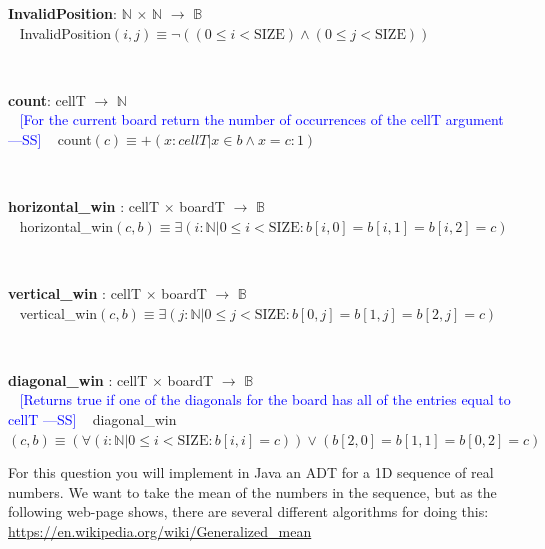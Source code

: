 \documentclass[12pt,fleqn]{examtst}
\newcommand{\authornote}[3]{\textcolor{#1}{[#3 ---#2]}}
\newcommand{\authornote}[3]{}
\newcommand{\wss}[1]{\authornote{blue}{SS}{#1}}
\begin{document}
\noindent \textbf{InvalidPosition}: $\mathbb{N}$ $\times$ $\mathbb{N}$ $\rightarrow$ $\mathbb{B}$\\
~\newline
InvalidPosition$(i, j) \equiv \neg ( ( 0 \leq i < \mbox{SIZE} ) \wedge ( 0 \leq j < \mbox{SIZE}))$

~\newline

\noindent \textbf{count}: cellT $\rightarrow$ $\mathbb{N}$\\
~\newline
\wss{For the current board return the number of occurrences of the cellT
  argument}
~\newline
count$(c) \equiv +(x : cellT | x \in b \land x = c : 1)$

~\newline

\noindent \textbf{horizontal\_win} : cellT $\times$ boardT $\rightarrow$ $\mathbb{B}$\\
~\newline
horizontal\_win$(c, b) \equiv \exists (i : \mathbb{N} | 0 \leq i < \mbox{SIZE} : b[i, 0] = b[i, 1] = b[i, 2] = c)$

~\newline

\noindent \textbf{vertical\_win} : cellT $\times$ boardT $\rightarrow$ $\mathbb{B}$\\
~\newline
vertical\_win$(c, b) \equiv \exists (j : \mathbb{N} | 0 \leq j < \mbox{SIZE} : b[0, j] = b[1, j] = b[2, j] = c)$

~\newline

\noindent \textbf{diagonal\_win} : cellT $\times$ boardT $\rightarrow$ $\mathbb{B}$\\
~\newline
\wss{Returns true if one of the diagonals for the board has all of the entries
  equal to cellT} 
~\newline
diagonal\_win$(c, b) \equiv (\forall(i : \mathbb{N}|0 \leq i < \mbox{SIZE}: b[i,i]=c)) \lor (b[2,0]=b[1,1]=b[0,2]=c)$



\newpage

 For this question you will implement in Java an ADT for a 1D
sequence of real numbers.  We want to take the mean of the numbers in the
sequence, but as the following web-page shows, there are several different
algorithms for doing this: \url{https://en.wikipedia.org/wiki/Generalized_mean}
\end{document}
